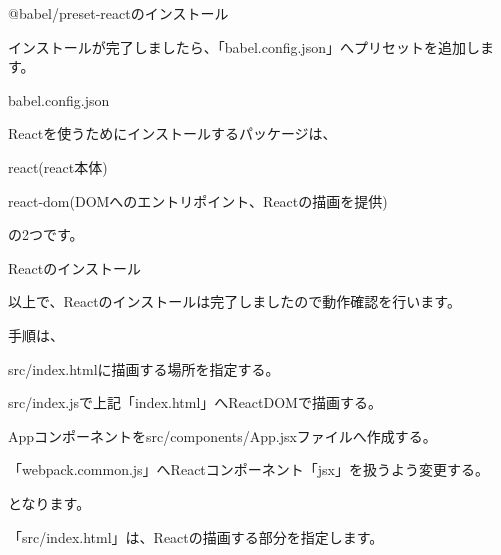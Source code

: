\def\startercodeblockfontsize{}
\begin{starterterminal}[]{@babel/preset{-}reactのインストール}\end{starterterminal}

インストールが完了しましたら、「babel.config.json」へプリセットを追加します。

\def\startercodeblockfontsize{}
\begin{starterprogram}[]{babel.config.json}\end{starterprogram}
\vspace*{\baselineskip}

Reactを使うためにインストールするパッケージは、\\[0pt]

\begin{starteritemize}
\item react(react本体)
\item react{-}dom(DOMへのエントリポイント、Reactの描画を提供)
\end{starteritemize}

の2つです。

\def\startercodeblockfontsize{}
\begin{starterterminal}[]{Reactのインストール}\end{starterterminal}

以上で、Reactのインストールは完了しましたので動作確認を行います。

\vspace*{\baselineskip}

手順は、\\[0pt]

\begin{starterenumerate}
\item src/index.htmlに描画する場所を指定する。
\item src/index.jsで上記「index.html」へReactDOMで描画する。
\item Appコンポーネントをsrc/components/App.jsxファイルへ作成する。
\item 「webpack.common.js」へReactコンポーネント「jsx」を扱うよう変更する。
\end{starterenumerate}

となります。

「src/index.html」は、Reactの描画する部分を指定します。

